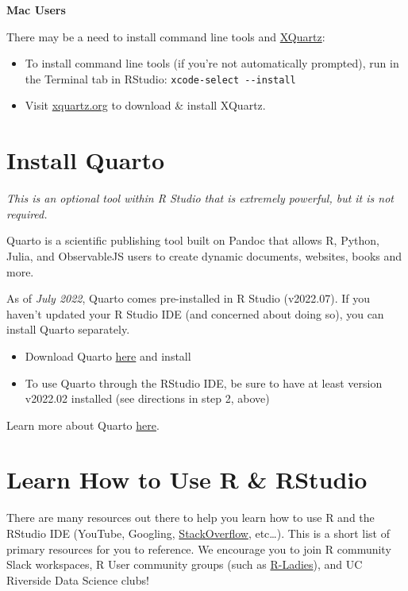 \documentclass[
]{book}
\begin{document}
\textbf{Mac Users}

There may be a need to install command line tools and \href{https://www.xquartz.org/}{XQuartz}:

\begin{itemize}
\item
  To install command line tools (if you're not automatically prompted), run in the Terminal tab in RStudio: \texttt{xcode-select\ -\/-install}
\item
  Visit \href{https://www.xquartz.org/}{xquartz.org} to download \& install XQuartz.
\end{itemize}

\hypertarget{install-quarto}{%
\section{Install Quarto}\label{install-quarto}}

\emph{This is an optional tool within R Studio that is extremely powerful, but it is not required.}

Quarto is a scientific publishing tool built on Pandoc that allows R, Python, Julia, and ObservableJS users to create dynamic documents, websites, books and more.

As of \emph{July 2022}, Quarto comes pre-installed in R Studio (v2022.07). If you haven't updated your R Studio IDE (and concerned about doing so), you can install Quarto separately.

\begin{itemize}
\item
  Download Quarto \href{https://quarto.org/docs/get-started/}{here} and install
\item
  To use Quarto through the RStudio IDE, be sure to have at least version v2022.02 installed (see directions in step 2, above)
\end{itemize}

Learn more about Quarto \href{https://quarto.org/docs/get-started/hello/rstudio.html}{here}.

\hypertarget{learn-how-to-use-r-rstudio}{%
\section{Learn How to Use R \& RStudio}\label{learn-how-to-use-r-rstudio}}

There are many resources out there to help you learn how to use R and the RStudio IDE (YouTube, Googling, \href{https://stackoverflow.com/}{StackOverflow}, etc\ldots). This is a short list of primary resources for you to reference. We encourage you to join R community Slack workspaces, R User community groups (such as \href{https://rladies.org/}{R-Ladies}), and UC Riverside Data Science clubs!
\end{document}
